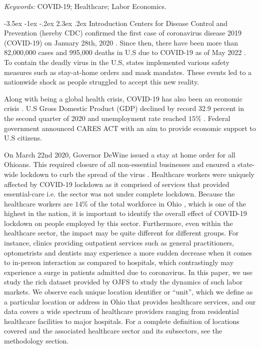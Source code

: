 \documentclass[11pt]{article}
\makeatletter
\renewcommand\section{\@startsection {section}{1}{\z@}%
                                       {-3.5ex \@plus -1ex \@minus -.2ex}%
                                       {2.3ex \@plus.2ex}%
                                       {\normalfont\fontfamily{phv}\fontsize{16}{19}\bfseries}}
\makeatother
\begin{document}
	\noindent%
	{\it Keywords:} COVID-19; Healthcare; Labor Economics.



\section{Introduction} \label{s:intro}
Centers for Disease Control and Prevention (hereby CDC) confirmed the first case of coronavirus disease 2019 (COVID-19) on January 28th, 2020 \cite{CDCcase1}. Since then, there have been more than 82,000,000 cases and 995,000 deaths in U.S due to COVID-19 as of May 2022 \cite{CDCtracker}. To contain the deadly virus in the U.S, states implemented various safety measures such as stay-at-home orders and mask mandates. These events led to a nationwide shock as people struggled to accept this new reality.

Along with being a global health crisis, COVID-19 has also been an economic crisis \cite{Adams-Prassl2020-ya}.
U.S Gross Domestic Product (GDP) declined by record 32.9 percent in the second quarter of 2020 \cite{BEAgdp} and unemployment rate reached $15\%$ \cite{BLSunemp}. Federal government announced CARES ACT with an aim to provide economic support to U.S citizens. 

On March 22nd 2020, Governor DeWine issued a stay at home order for all Ohioans. This required closure of all non-essential businesses and ensured a state-wide lockdown to curb the spread of the virus \cite{ODHorder}. Healthcare workers were uniquely affected by COVID-19 lockdown as it comprised of services that provided essential-care i.e. the sector was not under complete lockdown. Because the healthcare workers are $14\%$ of the total workforce in Ohio \cite{healthpct}, which is one of the highest in the nation, it is important to identify the overall effect of COVID-19 lockdown on people employed by this sector. Furthermore, even within the healthcare sector, the impact may be quite different for different groups. For instance, clinics providing outpatient services such as general practitioners, optometrists and dentists may experience a more sudden decrease when it comes to in-person interaction as compared to hospitals, which contrastingly may experience a surge in patients admitted due to coronavirus. In this paper, we use study the rich dataset provided by OJFS to study the dynamics of such labor markets. We observe each unique location identifier or “unit”, which we define as a particular location or address in Ohio that provides healthcare services, and our data covers a wide spectrum of healthcare providers ranging from residential healthcare facilities to major hospitals. For a complete definition of locations covered and the associated healthcare sector and its subsectors, see the methodology section.
\end{document}
